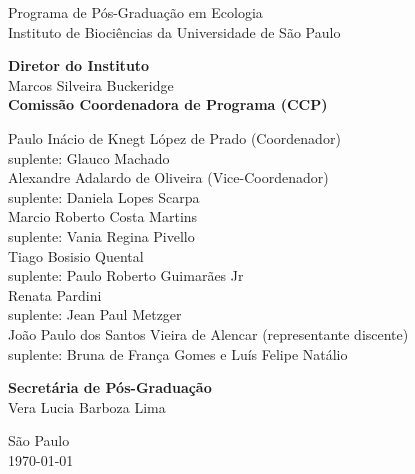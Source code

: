 {\LARGE Programa de Pós-Graduação em Ecologia \\[1ex]
  Instituto de Biociências da Universidade de São Paulo\\[1ex]
  }
\par
\vspace{0.01\paperheight}

{\Large 
  \textbf{Diretor do Instituto} \\[0.5em]
  Marcos Silveira Buckeridge\\
  \vspace{2em}
  \textbf{Comissão Coordenadora de Programa (CCP)} \\[0.5em]
  \begin{spacing}{1.2}
    Paulo Inácio de Knegt López de Prado (Coordenador)\\
    suplente: Glauco Machado \\ [0.75 em]
    Alexandre Adalardo de Oliveira (Vice-Coordenador)\\
    suplente: Daniela Lopes Scarpa \\ [0.75 em]
    Marcio Roberto Costa Martins\\
    suplente: Vania Regina Pivello \\ [0.75 em]
    Tiago Bosisio Quental\\
    suplente: Paulo Roberto Guimarães Jr\\ [0.75 em]
    Renata Pardini\\
    suplente:  Jean Paul Metzger  \\ [0.75 em]
João Paulo dos Santos Vieira de Alencar (representante discente)\\ [0.75 em]
    suplente:  Bruna de França Gomes  e Luís Felipe Natálio 
  \end{spacing}
  \vspace{1.25em}
  \textbf{Secretária de Pós-Graduação}\\[0.5em]
  Vera Lucia Barboza Lima\\
}

\vfill

{\Large São Paulo\\
\today}


